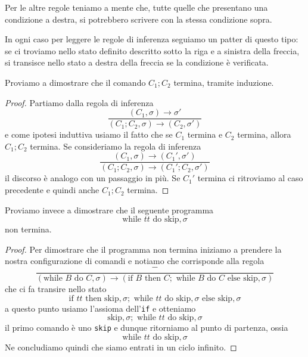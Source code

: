 Per le altre regole teniamo a mente che, tutte quelle che
presentano una condizione a destra, si potrebbero scrivere
con la stessa condizione sopra.

In ogni caso per leggere le regole di inferenza seguiamo un
patter di questo tipo: se ci troviamo nello stato definito
descritto sotto la riga e a sinistra della freccia, si
transisce nello stato a destra della freccia se la condizione
è verificata.

\begin{example}
	Proviamo a dimostrare che il comando $C_1 ; C_2$ termina,
	tramite induzione.
	\begin{proof}
		Partiamo dalla regola di inferenza
		\[
			\frac{(C_1, \sigma) \to \sigma'}
			{(C_1 ; C_2, \sigma) \to (C_2 , \sigma')}
		\]
		e come ipotesi induttiva usiamo il fatto che se
		$C_1$ termina e $C_2$ termina, allora $C_1 ; C_2$
		termina. Se consideriamo la regola di inferenza
		\[
			\frac{(C_1, \sigma) \to (C_1', \sigma')}
			{(C_1 ; C_2, \sigma) \to (C_1' ; C_2 , \sigma')}
		\]
		il discorso è analogo con un passaggio in più. Se
		$C_1'$ termina ci ritroviamo al caso precedente e
		quindi anche $C_1 ; C_2$ termina.
	\end{proof}
\end{example}

\begin{example}
	Proviamo invece a dimostrare che il seguente programma
	\[ \text{while } tt \text{ do} \text{ skip}, \sigma \]
	non termina.
	\begin{proof}
		Per dimostrare che il programma non termina iniziamo
		a prendere la nostra configurazione di comandi e
		notiamo che corrisponde alla regola
		\[
			\frac{-}{(\text{while } B \text{ do } C, \sigma)
				\to (\text{if } B \text{ then } C;
				\text{ while } B \text{ do } C
				\text{ else skip}, \sigma )}
		\]
		che ci fa transire nello stato
		\[
			\text{if } tt \text{ then skip}, \sigma;
			\text{ while } tt \text{ do skip}, \sigma
			\text{ else skip}, \sigma
		\]
		a questo punto usiamo l'assioma dell'\verb|if| e
		otteniamo
		\[
			\text{skip}, \sigma ; \text{ while } tt
			\text{ do skip}, \sigma
		\]
		il primo comando è uno \verb|skip| e dunque ritorniamo
		al punto di partenza, ossia
		\[ \text{while } tt \text{ do} \text{ skip}, \sigma \]
		Ne concludiamo quindi che siamo entrati in un ciclo
		infinito.
	\end{proof}
\end{example}
